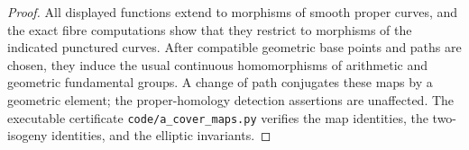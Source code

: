 \begin{proof}
All displayed functions extend to morphisms of smooth proper
curves, and the exact fibre computations show that they restrict
to morphisms of the indicated punctured curves. After compatible
geometric base points and paths are chosen, they induce the
usual continuous homomorphisms of arithmetic and geometric
fundamental groups. A change of path conjugates these maps by
a geometric element; the proper-homology detection assertions
are unaffected. The executable certificate
\texttt{code/a\_cover\_maps.py} verifies the map identities,
the two-isogeny identities, and the elliptic invariants.
\end{proof}
